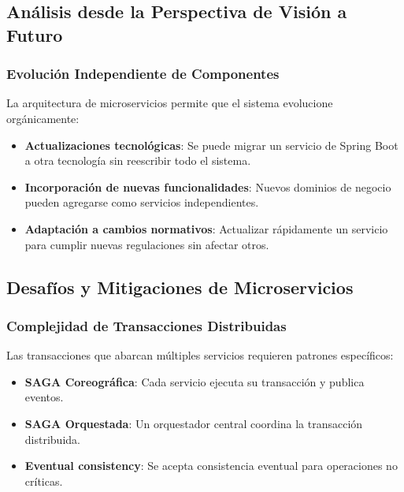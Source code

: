 \subsection{Análisis desde la Perspectiva de Visión a Futuro}

\subsubsection{Evolución Independiente de Componentes}

La arquitectura de microservicios permite que el sistema evolucione orgánicamente:

\begin{itemize}
    \item \textbf{Actualizaciones tecnológicas}: Se puede migrar un servicio de Spring Boot a otra tecnología sin reescribir todo el sistema.
    
    \item \textbf{Incorporación de nuevas funcionalidades}: Nuevos dominios de negocio pueden agregarse como servicios independientes.
    
    \item \textbf{Adaptación a cambios normativos}: Actualizar rápidamente un servicio para cumplir nuevas regulaciones sin afectar otros.
\end{itemize}

\subsection{Desafíos y Mitigaciones de Microservicios}

\subsubsection{Complejidad de Transacciones Distribuidas}

Las transacciones que abarcan múltiples servicios requieren patrones específicos:

\begin{itemize}
    \item \textbf{SAGA Coreográfica}: Cada servicio ejecuta su transacción y publica eventos.
    \item \textbf{SAGA Orquestada}: Un orquestador central coordina la transacción distribuida.
    \item \textbf{Eventual consistency}: Se acepta consistencia eventual para operaciones no críticas.
\end{itemize}


